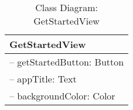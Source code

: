 \begin{table}[ht]
\centering
\caption{Class Diagram: GetStartedView}

\hspace{1em}
\renewcommand{\arraystretch}{1.7}

\begin{tabular}{|l|}
\hline
\textbf{GetStartedView} \\
\hline
– getStartedButton: Button \\
– appTitle: Text \\
– backgroundColor: Color \\
\hline
\end{tabular}
\end{table}
